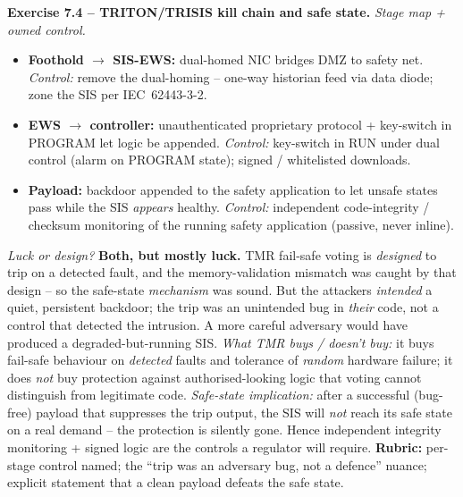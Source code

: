 \documentclass[11pt,a4paper]{article}
\begin{document}
\begin{solutionbox}
\textbf{Exercise 7.4 -- TRITON/TRISIS kill chain and safe state.}
\emph{Stage map + owned control.}
\begin{itemize}\setlength{\itemsep}{1pt}
  \item \textbf{Foothold $\to$ SIS-EWS:} dual-homed NIC bridges DMZ to safety
        net. \emph{Control:} remove the dual-homing -- one-way historian feed
        via data diode; zone the SIS per IEC~62443-3-2.
  \item \textbf{EWS $\to$ controller:} unauthenticated proprietary protocol +
        key-switch in PROGRAM let logic be appended. \emph{Control:}
        key-switch in RUN under dual control (alarm on PROGRAM state); signed /
        whitelisted downloads.
  \item \textbf{Payload:} backdoor appended to the safety application to let
        unsafe states pass while the SIS \emph{appears} healthy.
        \emph{Control:} independent code-integrity / checksum monitoring of the
        running safety application (passive, never inline).
\end{itemize}
\emph{Luck or design?} \textbf{Both, but mostly luck.} TMR fail-safe voting is
\emph{designed} to trip on a detected fault, and the memory-validation mismatch
was caught by that design -- so the safe-state \emph{mechanism} was sound. But
the attackers \emph{intended} a quiet, persistent backdoor; the trip was an
unintended bug in \emph{their} code, not a control that detected the intrusion.
A more careful adversary would have produced a degraded-but-running SIS.
\emph{What TMR buys / doesn't buy:} it buys fail-safe behaviour on
\emph{detected} faults and tolerance of \emph{random} hardware failure; it does
\emph{not} buy protection against authorised-looking logic that voting cannot
distinguish from legitimate code. \emph{Safe-state implication:} after a
successful (bug-free) payload that suppresses the trip output, the SIS will
\emph{not} reach its safe state on a real demand -- the protection is silently
gone. Hence independent integrity monitoring + signed logic are the controls a
regulator will require.
\textbf{Rubric:} per-stage control named; the ``trip was an adversary bug, not
a defence'' nuance; explicit statement that a clean payload defeats the safe
state.
\end{solutionbox}
\end{document}
